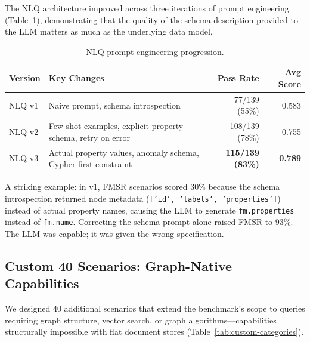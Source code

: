 \documentclass[11pt]{article}
\begin{document}
The NLQ architecture improved across three iterations of prompt engineering (Table~\ref{tab:nlq-progression}), demonstrating that the quality of the schema description provided to the LLM matters as much as the underlying data model.

\begin{table}[t]
  \centering
  \caption{NLQ prompt engineering progression.}
  \label{tab:nlq-progression}
  \begin{tabular}{@{}lp{6.5cm}rr@{}}
    \toprule
    \textbf{Version} & \textbf{Key Changes} & \textbf{Pass Rate} & \textbf{Avg Score} \\
    \midrule
    NLQ v1 & Naive prompt, schema introspection          & 77/139 (55\%)  & 0.583 \\
    NLQ v2 & Few-shot examples, explicit property schema, retry on error & 108/139 (78\%) & 0.755 \\
    NLQ v3 & Actual property values, anomaly schema, Cypher-first constraint & \textbf{115/139 (83\%)} & \textbf{0.789} \\
    \bottomrule
  \end{tabular}
\end{table}

A striking example: in v1, FMSR scenarios scored 30\% because the schema introspection returned node metadata (\texttt{['id', 'labels', 'properties']}) instead of actual property names, causing the LLM to generate \texttt{fm.properties} instead of \texttt{fm.name}. Correcting the schema prompt alone raised FMSR to 93\%. The LLM was capable; it was given the wrong specification.

\subsection{Custom 40 Scenarios: Graph-Native Capabilities}
\label{sec:new-scenarios}

We designed 40 additional scenarios that extend the benchmark's scope to queries requiring graph structure, vector search, or graph algorithms---capabilities structurally impossible with flat document stores (Table~\ref{tab:custom-categories}).
\end{document}
